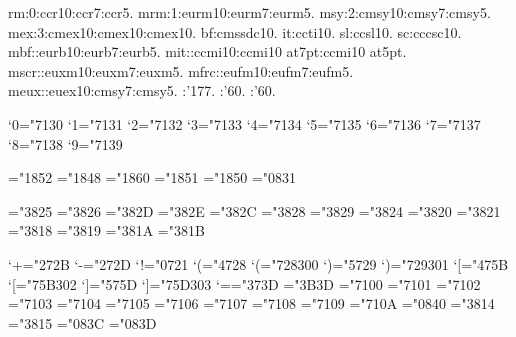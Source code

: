 \newfont rm:0:ccr10:ccr7:ccr5.
\newmathfont mrm:1:eurm10:eurm7:eurm5.
\newmathfont msy:2:cmsy10:cmsy7:cmsy5.
\newmathfont mex:3:cmex10:cmex10:cmex10.
\newtextfont bf:cmssdc10.
\newtextfont it:ccti10.
\newtextfont sl:ccsl10.
\newtextfont sc:cccsc10.
\newfam\mbffam \newfam\mitfam \newfam\mscrfam \newfam\mfrcfam \newfam\meuxfam
\newmathfont mbf:\mbffam:eurb10:eurb7:eurb5.
\newmathfont mit:\mitfam:ccmi10:ccmi10 at7pt:ccmi10 at5pt.
\newmathfont mscr:\mscrfam:euxm10:euxm7:euxm5.
\newmathfont mfrc:\mfrcfam:eufm10:eufm7:eufm5.
\newmathfont meux:\meuxfam:euex10:cmsy7:cmsy5.
:'177.
:'60.
\setskewchar \mscrfam:'60.

\mathcode`0="7130
\mathcode`1="7131
\mathcode`2="7132
\mathcode`3="7133
\mathcode`4="7134
\mathcode`5="7135
\mathcode`6="7136
\mathcode`7="7137
\mathcode`8="7138
\mathcode`9="7139

\mathchardef\intop="1852
\mathchardef\ointop="1848
\mathchardef\coprod="1860
\mathchardef\prod="1851
\mathchardef\sum="1850
\mathchardef\infty="0831

\mathchardef\nearrow="3825
\mathchardef\searrow="3826
\mathchardef\nwarrow="382D
\mathchardef\swarrow="382E
\mathchardef\Leftrightarrow="382C
\mathchardef\Leftarrow="3828
\mathchardef\Rightarrow="3829
\mathchardef\leftrightarrow="3824 
\mathchardef\leftarrow="3820 
\mathchardef\rightarrow="3821 
\def\uparrow{\delimiter"3822378 }
\def\downarrow{\delimiter"3823379 }
\def\updownarrow{\delimiter"386C33F }
\def\Uparrow{\delimiter"382A37E }
\def\Downarrow{\delimiter"382B37F }
\def\Updownarrow{\delimiter"386D377 }
\mathchardef\leftharpoonup="3818
\mathchardef\leftharpoondown="3819
\mathchardef\rightharpoonup="381A
\mathchardef\rightharpoondown="381B

\mathcode`+="272B
\mathcode`-="272D
\mathcode`!="0721
\mathcode`(="4728 \delcode`(="728300
\mathcode`)="5729 \delcode`)="729301
\mathcode`[="475B \delcode`[="75B302
\mathcode`]="575D \delcode`]="75D303
\mathcode`=="373D
\mathchardef\Relbar="3B3D %
\mathchardef\Gamma="7100
\mathchardef\Delta="7101
\mathchardef\Theta="7102
\mathchardef\Lambda="7103
\mathchardef\Xi="7104
\mathchardef\Pi="7105
\mathchardef\Sigma="7106
\mathchardef\Upsilon="7107
\mathchardef\Phi="7108
\mathchardef\Psi="7109
\mathchardef\Omega="710A
\let\varsigma=\sigma \let\varrho=\rho %
\mathchardef\aleph="0840
\def\rbrace{\delimiter"5867A09 } \let\}=\rbrace
\def\lbrace{\delimiter"4866A08 } \let\{=\lbrace
\mathchardef\leq="3814 \let\le=\leq
\mathchardef\geq="3815 \let\ge=\geq
\mathchardef\Re="083C
\mathchardef\Im="083D
\def\vert{\delimiter"86A30C }
\def\backslash{\delimiter"86E30F }

\rm
